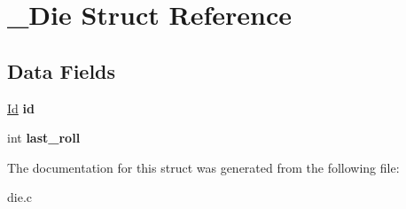 \hypertarget{struct__Die}{}\section{\+\_\+\+Die Struct Reference}
\label{struct__Die}
\subsection*{Data Fields}
\begin{DoxyCompactItemize}
\item 
\mbox{\label{struct__Die_a0887af562dda760409957f13619d36f1}} 
\hyperlink{types_8h_a845e604fb28f7e3d97549da3448149d3}{Id} {\bfseries id}
\item 
\mbox{\label{struct__Die_a522e4527bd70cf87afcbabd9d9dede34}} 
int {\bfseries last\+\_\+roll}
\end{DoxyCompactItemize}


The documentation for this struct was generated from the following file\+:\begin{DoxyCompactItemize}
\item 
die.\+c\end{DoxyCompactItemize}
